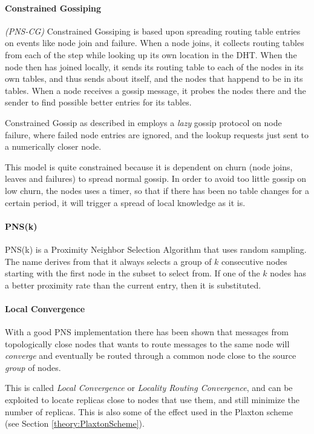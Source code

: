 \paragraph{Constrained Gossiping}
\emph{(PNS-CG)} 
Constrained Gossiping is based upon spreading routing table entries on events like node
 join and failure. When a node joins, it collects routing tables from each of the step
 while looking up its own location in the DHT. When the node then has joined locally, it
 sends its routing table to each of the nodes in its own tables, and thus sends
  about itself, and the nodes that happend to be in its tables. When a node
 receives a gossip message, it probes the nodes there and the sender to find possible
 better entries for its tables.

Constrained Gossip as described in \cite{castro-03-proximity} employs a \emph{lazy}
 gossip protocol on node failure, where failed node entries are ignored, and the lookup
 requests just sent to a numerically closer node.

This model is quite constrained because it is dependent on churn (node joins, leaves and
 failures) to spread normal gossip. In order to avoid too little gossip on low churn,
 the nodes uses a timer, so that if there has been no table changes for a certain period,
 it will trigger a spread of local knowledge as it is.

\paragraph{PNS(k)}\cite{gummadi-03-impact-geometry}
PNS(k) is a Proximity Neighbor Selection Algorithm that uses random sampling. The name
 derives from that it always selects a group of $k$ consecutive nodes starting with the
 first node in the subset to select from. If one of the $k$ nodes has a better
 proximity rate than the current entry, then it is substituted.

\paragraph{Local Convergence}

With a good PNS implementation there has been shown that messages from topologically
 close nodes that wants to route messages to the same  node will
 \emph{converge} and eventually be routed through a common node close to the source \emph{group}\cite{gummadi-03-impact-geometry,castro-03-proximity} of nodes.

This is called \emph{Local Convergence} or \emph{Locality Routing Convergence}, and
 can be exploited to locate replicas close to nodes that use them, and still minimize
 the number of replicas. This is also some of the effect used in the Plaxton scheme\cite{plaxton-97-accessing-nearby} (see Section \ref{theory:PlaxtonScheme}).

